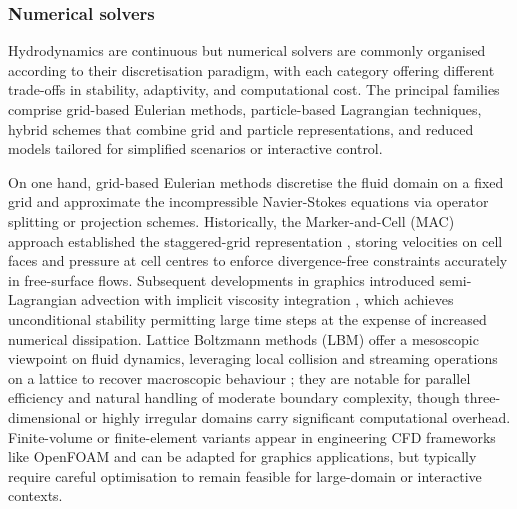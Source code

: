 
\subsubsection{Numerical solvers}

Hydrodynamics are continuous but numerical solvers are commonly organised according to their discretisation paradigm, with each category offering different trade-offs in stability, adaptivity, and computational cost. The principal families comprise grid-based Eulerian methods, particle-based Lagrangian techniques, hybrid schemes that combine grid and particle representations, and reduced models tailored for simplified scenarios or interactive control.

On one hand, grid-based Eulerian methods discretise the fluid domain on a fixed grid and approximate the incompressible Navier-Stokes equations via operator splitting or projection schemes. Historically, the Marker-and-Cell (MAC) approach established the staggered-grid representation \cite{Harlow1965}, storing velocities on cell faces and pressure at cell centres to enforce divergence-free constraints accurately in free-surface flows. Subsequent developments in graphics introduced semi-Lagrangian advection with implicit viscosity integration \cite{Stam1999}, which achieves unconditional stability permitting large time steps at the expense of increased numerical dissipation. Lattice Boltzmann methods (LBM) offer a mesoscopic viewpoint on fluid dynamics, leveraging local collision and streaming operations on a lattice to recover macroscopic behaviour \cite{Chen1998}; they are notable for parallel efficiency and natural handling of moderate boundary complexity, though three-dimensional or highly irregular domains carry significant computational overhead. Finite-volume or finite-element variants appear in engineering CFD frameworks like OpenFOAM and can be adapted for graphics applications, but typically require careful optimisation to remain feasible for large-domain or interactive contexts. %

